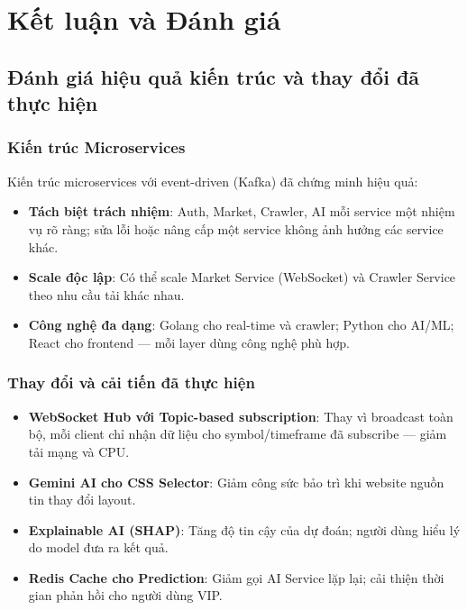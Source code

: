 
\section{Kết luận và Đánh giá}
\label{sec:ket-luan-danh-gia}

\subsection{Đánh giá hiệu quả kiến trúc và thay đổi đã thực hiện}

\subsubsection{Kiến trúc Microservices}

Kiến trúc microservices với event-driven (Kafka) đã chứng minh hiệu quả:
\begin{itemize}
    \item \textbf{Tách biệt trách nhiệm}: Auth, Market, Crawler, AI mỗi service một nhiệm vụ rõ ràng; sửa lỗi hoặc nâng cấp một service không ảnh hưởng các service khác.
    \item \textbf{Scale độc lập}: Có thể scale Market Service (WebSocket) và Crawler Service theo nhu cầu tải khác nhau.
    \item \textbf{Công nghệ đa dạng}: Golang cho real-time và crawler; Python cho AI/ML; React cho frontend --- mỗi layer dùng công nghệ phù hợp.
\end{itemize}

\subsubsection{Thay đổi và cải tiến đã thực hiện}

\begin{itemize}
    \item \textbf{WebSocket Hub với Topic-based subscription}: Thay vì broadcast toàn bộ, mỗi client chỉ nhận dữ liệu cho symbol/timeframe đã subscribe --- giảm tải mạng và CPU.
    \item \textbf{Gemini AI cho CSS Selector}: Giảm công sức bảo trì khi website nguồn tin thay đổi layout.
    \item \textbf{Explainable AI (SHAP)}: Tăng độ tin cậy của dự đoán; người dùng hiểu lý do model đưa ra kết quả.
    \item \textbf{Redis Cache cho Prediction}: Giảm gọi AI Service lặp lại; cải thiện thời gian phản hồi cho người dùng VIP.
\end{itemize}


